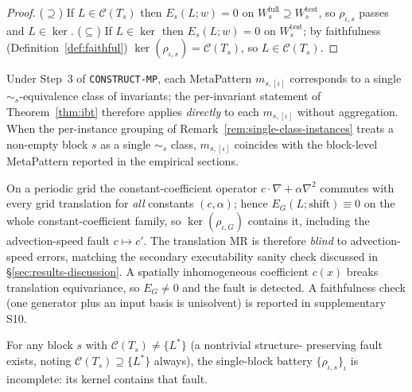 \begin{proof}
($\supseteq$) If $L\in\mathcal{C}(T_s)$ then $E_s(L;w)=0$ on $W^{\mathrm{full}}_s\supseteq
W^{\mathrm{test}}_s$, so $\rho_{\iota,s}$ passes and $L\in\ker$.
($\subseteq$) If $L\in\ker$ then $E_s(L;w)=0$ on $W^{\mathrm{test}}_s$; by faithfulness
(Definition~\ref{def:faithful}) $\ker(\rho_{\iota,s})=\mathcal{C}(T_s)$, so
$L\in\mathcal{C}(T_s)$.
\end{proof}

\begin{remark}
\label{rem:ibt-mp}
Under Step~3 of \texttt{CONSTRUCT-MP}, each MetaPattern $m_{s,[\iota]}$ corresponds
to a single $\sim_s$-equivalence class of invariants; the per-invariant statement
of Theorem~\ref{thm:ibt} therefore applies \emph{directly} to each $m_{s,[\iota]}$
without aggregation. When the per-instance grouping of
Remark~\ref{rem:single-class-instances} treats a non-empty block $s$ as a single
$\sim_s$ class, $m_{s,[\iota]}$ coincides with the block-level MetaPattern reported
in the empirical sections.
\end{remark}

\begin{remark}
\label{rem:ibt-advdiff}
On a periodic grid the constant-coefficient operator $c\cdot\nabla+\alpha\nabla^2$
commutes with every grid translation for \emph{all} constants $(c,\alpha)$; hence
$E_G(L;\text{shift})\equiv 0$ on the whole constant-coefficient family, so
$\ker(\rho_{\iota,G})$ contains it, including the advection-speed fault $c\mapsto c'$.
The translation MR is therefore \emph{blind} to advection-speed errors, matching
the secondary executability sanity check discussed in
\S\ref{sec:results-discussion}.
A spatially inhomogeneous coefficient $c(x)$ breaks translation equivariance, so
$E_G\neq 0$ and the fault is detected. A faithfulness check (one generator plus an
input basis is unisolvent) is reported in supplementary S10.
\end{remark}

\begin{corollary*}
For any block $s$ with $\mathcal{C}(T_s)\neq\{L^{*}\}$ (a nontrivial structure-
preserving fault exists, noting $\mathcal{C}(T_s)\supseteq\{L^{*}\}$ always), the
single-block battery $\{\rho_{\iota,s}\}_\iota$ is
incomplete: its kernel contains that fault.
\end{corollary*}

